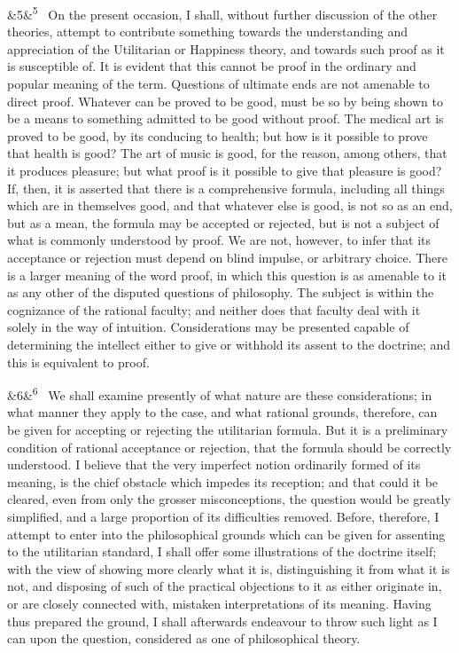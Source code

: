 \documentclass[12pt]{article}
\newcommand{\para}[1][]{\par\noindent\ifx&#1&\else\textsuperscript{\footnotesize #1}~\fi}
\begin{document}
\para[5] On the present occasion, I shall, without further discussion of the other theories, attempt to contribute something towards the understanding and appreciation of the Utilitarian or Happiness theory, and towards such proof as it is susceptible of. It is evident that this cannot be proof in the ordinary and popular meaning of the term. Questions of ultimate ends are not amenable to direct proof. Whatever can be proved to be good, must be so by being shown to be a means to something admitted to be good without proof. The medical art is proved to be good, by its conducing to health; but how is it possible to prove that health is good? The art of music is good, for the reason, among others, that it produces pleasure; but what proof is it possible to give that pleasure is good? If, then, it is asserted that there is a comprehensive formula, including all things which are in themselves good, and that whatever else is good, is not so as an end, but as a mean, the formula may be accepted or rejected, but is not a subject of what is commonly understood by proof. We are not, however, to infer that its acceptance or rejection must depend on blind impulse, or arbitrary choice. There is a larger meaning of the word proof, in which this question is as amenable to it as any other of the disputed questions of philosophy. The subject is within the cognizance of the rational faculty; and neither does that faculty deal with it solely in the way of intuition. Considerations may be presented capable of determining the intellect either to give or withhold its assent to the doctrine; and this is equivalent to proof.

\para[6] We shall examine presently of what nature are these considerations; in what manner they apply to the case, and what rational grounds, therefore, can be given for accepting or rejecting the utilitarian formula. But it is a preliminary condition of rational acceptance or rejection, that the formula should be correctly understood. I believe that the very imperfect notion ordinarily formed of its meaning, is the chief obstacle which impedes its reception; and that could it be cleared, even from only the grosser misconceptions, the question would be greatly simplified, and a large proportion of its difficulties removed. Before, therefore, I attempt to enter into the philosophical grounds which can be given for assenting to the utilitarian standard, I shall offer some illustrations of the doctrine itself; with the view of showing more clearly what it is, distinguishing it from what it is not, and disposing of such of the practical objections to it as either originate in, or are closely connected with, mistaken interpretations of its meaning. Having thus prepared the ground, I shall afterwards endeavour to throw such light as I can upon the question, considered as one of philosophical theory.
\end{document}
